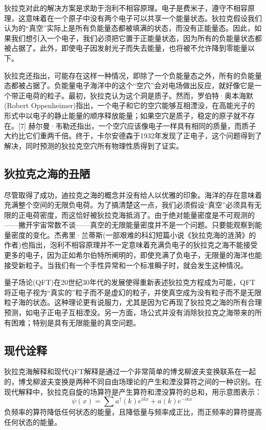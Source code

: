 狄拉克对此的解决方案是求助于泡利不相容原理。电子是费米子，遵守不相容原理，这意味着在一个原子中没有两个电子可以共享一个能量状态。狄拉克假设我们认为的“真空”实际上是所有负能量态都被填满的状态，而没有正能量态。因此，如果我们想引入一个电子，我们必须把它置于正能量状态，因为所有的负能量状态都被占据了。此外，即使电子因发射光子而失去能量，也将被不允许降到零能量以下。

狄拉克还指出，可能存在这样一种情况，即除了一个负能量态之外，所有的负能量态都被占据了。负能量电子海洋中的这个“空穴”会对电场做出反应，就好像它是一个带正电荷的粒子。最初，狄拉克认为这个洞是质子。然而，罗伯特·奥本海默(Robert Oppenheimer)指出，一个电子和它的空穴能够互相湮没，在高能光子的形式中以电子的静止能量的顺序释放能量；如果空穴是质子，稳定的原子就不存在。[7] 赫尔曼·韦勒还指出，一个空穴应该像电子一样具有相同的质量，而质子大约比它们重两千倍。终于，卡尔安德森于1932年发现了正电子，这个问题得到了解决，同时预测的狄拉克空穴所有物理性质得到了证实。

\subsection{狄拉克之海的丑陋}
尽管取得了成功，迪拉克之海的概念并没有给人以优雅的印象。海洋的存在意味着充满整个空间的无限负电荷。为了搞清楚这一点，我们必须假设“真空”必须具有无限的正电荷密度，而这恰好被狄拉克海抵消了。由于绝对能量密度是不可观测的——撇开宇宙常数不谈——真空的无限能量密度并不是一个问题。只要能观察到能量密度的变化。杰弗里·兰蒂斯(一部艰难的科幻短篇小说《狄拉克海的涟漪》的作者)也指出，泡利不相容原理并不一定意味着充满负电子的狄拉克之海不能接受更多的电子，因为正如希尔伯特所阐明的，即使充满了负电子，无限量的海洋也能接受新粒子。当我们有一个手性异常和一个标准瞬子时，就会发生这种情况。

量子场论(QFT)在20世纪30年代的发展使得重新表述狄拉克方程成为可能，QFT将正电子视为“真实的”粒子而不是虚幻的粒子，并使真空成为没有粒子而不是无限粒子海的状态。这种理论更有说服力，尤其是因为它再现了狄拉克之海的所有合理预测，如电子正电子互相湮没。另一方面，场公式并没有消除狄拉克之海带来的所有困难；特别是具有无限能量的真空问题。

\subsection{现代诠释}
狄拉克海解释和现代QFT解释是通过一个非常简单的博戈柳波夫变换联系在一起的，博戈柳波夫变换是两种不同自由场理论的产生和湮没算符之间的一种识别。在现代解释中，狄拉克自旋的场算符是产生算符和湮没算符的总和，用示意图表示：
$$\psi(x) = \sum a^\dagger(k)e^{ikx} + a(k)e^{-ikx}~$$
负频率的算符降低任何状态的能量，且降低量与频率成正比，而正频率的算符提高任何状态的能量。

